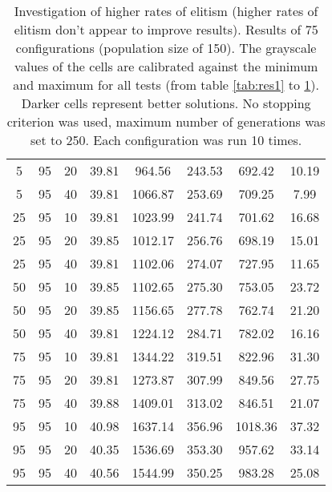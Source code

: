 \begin{table}[h]
\begin{tabular}{ccc|c|c|c|c|c}
5 & 95 & 20 & \cellcolor{gray!50}39.81 & \cellcolor{gray!11}964.56 & \cellcolor{gray!1}243.53 & \cellcolor{gray!40}692.42 & 10.19\\
5 & 95 & 40 & \cellcolor{gray!50}39.81 & \cellcolor{gray!1}1066.87 & \cellcolor{gray!1}253.69 & \cellcolor{gray!35}709.25 & 7.99\\
25 & 95 & 10 & \cellcolor{gray!50}39.81 & \cellcolor{gray!1}1023.99 & \cellcolor{gray!1}241.74 & \cellcolor{gray!38}701.62 & 16.68\\
25 & 95 & 20 & \cellcolor{gray!50}39.85 & \cellcolor{gray!3}1012.17 & \cellcolor{gray!1}256.76 & \cellcolor{gray!39}698.19 & 15.01\\
25 & 95 & 40 & \cellcolor{gray!50}39.81 & \cellcolor{gray!1}1102.06 & \cellcolor{gray!1}274.07 & \cellcolor{gray!30}727.95 & 11.65\\
50 & 95 & 10 & \cellcolor{gray!50}39.85 & \cellcolor{gray!1}1102.65 & \cellcolor{gray!1}275.30 & \cellcolor{gray!22}753.05 & 23.72\\
50 & 95 & 20 & \cellcolor{gray!50}39.85 & \cellcolor{gray!1}1156.65 & \cellcolor{gray!1}277.78 & \cellcolor{gray!19}762.74 & 21.20\\
50 & 95 & 40 & \cellcolor{gray!50}39.81 & \cellcolor{gray!1}1224.12 & \cellcolor{gray!1}284.71 & \cellcolor{gray!13}782.02 & 16.16\\
75 & 95 & 10 & \cellcolor{gray!50}39.81 & \cellcolor{gray!1}1344.22 & \cellcolor{gray!1}319.51 & \cellcolor{gray!1}822.96 & 31.30\\
75 & 95 & 20 & \cellcolor{gray!50}39.81 & \cellcolor{gray!1}1273.87 & \cellcolor{gray!1}307.99 & \cellcolor{gray!1}849.56 & 27.75\\
75 & 95 & 40 & \cellcolor{gray!50}39.88 & \cellcolor{gray!1}1409.01 & \cellcolor{gray!1}313.02 & \cellcolor{gray!1}846.51 & 21.07\\
95 & 95 & 10 & \cellcolor{gray!39}40.98 & \cellcolor{gray!1}1637.14 & \cellcolor{gray!1}356.96 & \cellcolor{gray!1}1018.36 & 37.32\\
95 & 95 & 20 & \cellcolor{gray!45}40.35 & \cellcolor{gray!1}1536.69 & \cellcolor{gray!1}353.30 & \cellcolor{gray!1}957.62 & 33.14\\
95 & 95 & 40 & \cellcolor{gray!43}40.56 & \cellcolor{gray!1}1544.99 & \cellcolor{gray!1}350.25 & \cellcolor{gray!1}983.28 & 25.08
\end{tabular}
\caption{Investigation of higher rates of elitism (higher rates of elitism don't appear to improve results). Results of 75 configurations (population size of 150). The grayscale values of the cells are calibrated against the minimum and maximum for all tests (from table \ref{tab:res1} to \ref{tab:res5}). Darker cells represent better solutions. No stopping criterion was used, maximum number of generations was set to 250. Each configuration was run 10 times.}
\label{tab:res5}
\end{table}

\restoregeometry